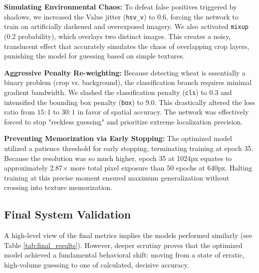 \begin{table}[!t]
\textbf{Simulating Environmental Chaos:} 
To defeat false positives triggered by shadows, we increased the Value jitter (\texttt{hsv\_v}) to 0.6, forcing the network to train on artificially darkened and overexposed imagery. We also activated \texttt{mixup} (0.2 probability), which overlays two distinct images. This creates a noisy, translucent effect that accurately simulates the chaos of overlapping crop layers, punishing the model for guessing based on simple textures.

\textbf{Aggressive Penalty Re-weighting:} 
Because detecting wheat is essentially a binary problem (crop vs. background), the classification branch requires minimal gradient bandwidth. We slashed the classification penalty (\texttt{cls}) to 0.3 and intensified the bounding box penalty (\texttt{box}) to 9.0. This drastically altered the loss ratio from $15:1$ to $30:1$ in favor of spatial accuracy. The network was effectively forced to stop "reckless guessing" and prioritize extreme localization precision.

\textbf{Preventing Memorization via Early Stopping:} 
The optimized model utilized a patience threshold for early stopping, terminating training at epoch 35. Because the resolution was so much higher, epoch 35 at 1024px equates to approximately 2.87$\times$ more total pixel exposure than 50 epochs at 640px. Halting training at this precise moment ensured maximum generalization without crossing into texture memorization.

\subsection{Final System Validation}
\label{subsec:final_results}

A high-level view of the final metrics implies the models performed similarly (see Table \ref{tab:final_results}). However, deeper scrutiny proves that the optimized model achieved a fundamental behavioral shift: moving from a state of erratic, high-volume guessing to one of calculated, decisive accuracy. 

\begin{table}[h]
\centering
\caption{Validation Metrics Comparison. The optimized model dramatically improved its median confidence threshold.}
\label{tab:final_results}
\end{table}


\end{table}
